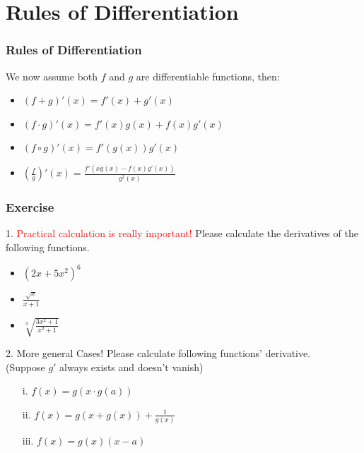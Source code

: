 \documentclass{beamer}
\begin{document}
\section{Rules of Differentiation}
\begin{frame}
    \frametitle{Rules of Differentiation}
We now assume both $f$ and $g$ are differentiable functions, then:
\begin{itemize}
    \item $(f+g)'(x)=f'(x)+g'(x)$
    \vspace{1em}
    \item $(f\cdot g)'(x)=f'(x)g(x)+f(x)g'(x)$
    \vspace{1em}
    \item $(f\circ g)'(x)=f'(g(x))g'(x)$
    \vspace{1em}
    \item $(\frac{f}{g})'(x)=\frac{f'(xg(x)-f(x)g'(x))}{g^2(x)}$
    \vspace{1em}
\end{itemize}
\end{frame}
\begin{frame}
    \frametitle{Exercise}
1. \textcolor{red}{Practical calculation is really important!}
 Please calculate the derivatives of the following functions.
\begin{itemize}
    \item $(2x+5x^2)^6$
    \vspace{0.3em}
    \item $\frac{\sqrt{x}}{x+1}$
    \vspace{0.3em}
    \item $\sqrt[3]{\frac{3x^2+1}{x^2+1}}$
\end{itemize}
\end{frame}
\begin{frame}
    2. More general Cases! Please calculate following functions' derivative.\\(Suppose $g'$ always exists and doesn't vanish)
    \begin{enumerate}
        \item[i.]   $f(x)=g(x\cdot g(a))$
        \item[ii.]  $f(x)=g(x+g(x))+\frac{1}{g(x)}$ 
        \item[iii.] $f(x) =g(x)(x-a)$ 
    \end{enumerate}
    
    \end{frame}
\end{document}
